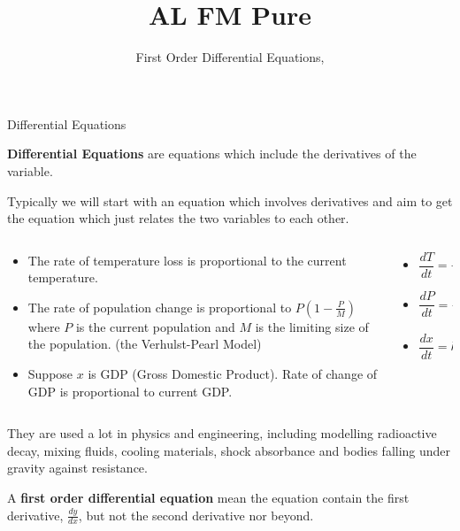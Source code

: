 \documentclass[8pt]{beamer}
\title[Pure]{{\color{aa}\Huge\adfbullet{9}}AL FM Pure}
\subtitle{First Order Differential Equations, \textattachfile{FirstOrderDifferentialEquations.tex}{(TeX)}}
\begin{document}
	
	\setlength{\abovedisplayskip}{0pt}
	\setlength{\belowdisplayskip}{0pt}
	\setlength{\abovedisplayshortskip}{0pt}
	\setlength{\belowdisplayshortskip}{0pt}

\frame{\titlepage}


\begin{frame}[shrink]{Differential Equations}
	\begin{definition}
		\textbf{Differential Equations} are equations which include the derivatives of the variable.
	\end{definition}
	\alert<1>{Typically we will start with an equation which involves derivatives and aim to get the equation which just relates the two variables to each other.}
	
		\begin{columns}
			\begin{column}{0.6\linewidth}
				\begin{example}
					\begin{itemize}
						\item The rate of temperature loss is proportional to the current temperature.
						\item The rate of population change is proportional to $P\left( 1-\frac{P}{M} \right) $ where $P$ is the current population and $M$ is the limiting size of the population. (the Verhulst-Pearl Model)
						\item Suppose $x$ is GDP (Gross Domestic Product). Rate of change of GDP is proportional to current GDP.
					\end{itemize}
				\end{example}
			\end{column}
			\begin{column}{0.4\linewidth}
				\begin{itemize}
					\item \[
					\frac{dT}{dt}=-kT
					.\] 
					\item \[
					\frac{dP}{dt}=-kP\left( 1-\frac{P}{M} \right)               
					.\] 
					\item \[                    
					\frac{dx}{dt}=kx
					.\] 
				\end{itemize}
			\end{column}	
		\end{columns}
		

	They are used a lot in physics and engineering, including modelling radioactive decay, mixing fluids, cooling materials, shock absorbance and bodies falling under gravity against resistance.
	\begin{definition}
		A \textbf{first order differential equation} mean the equation contain the first derivative, $\frac{dy}{dx}$, but not the second derivative nor beyond. 
	\end{definition}
\end{frame}
\end{document}
